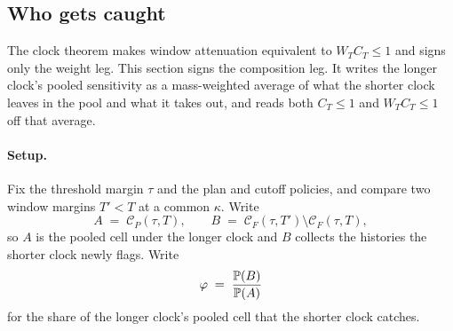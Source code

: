 %

\subsection{Who gets caught}
\label{sec:caught}

The clock theorem makes window attenuation equivalent to $W_T C_T \le 1$ and signs only the weight
leg. This section signs the composition leg. It writes the longer clock's pooled sensitivity as a
mass-weighted average of what the shorter clock leaves in the pool and what it takes out, and reads
both $C_T \le 1$ and $W_T C_T \le 1$ off that average.

\paragraph{Setup.}
Fix the threshold margin $\tau$ and the plan and cutoff policies, and compare two window margins
$T' < T$ at a common $\kappa$. Write
\begin{equation}
\label{eq:caught-sets}
A \;=\; \mathcal{C}_P(\tau,T),
\qquad
B \;=\; \mathcal{C}_F(\tau,T')\setminus\mathcal{C}_F(\tau,T),
\end{equation}
so $A$ is the pooled cell under the longer clock and $B$ collects the histories the shorter clock
newly flags. Write
\begin{equation}
\label{eq:caught-phi}
\varphi \;=\; \frac{\mathbb{P}(B)}{\mathbb{P}(A)}
\end{equation}
for the share of the longer clock's pooled cell that the shorter clock catches.

